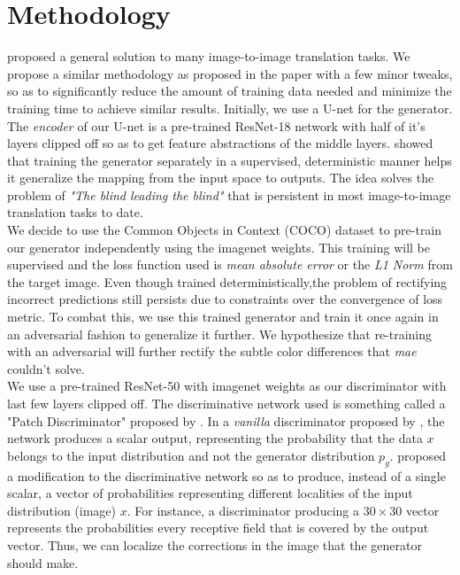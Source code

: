 \documentclass[oneside,a4paper,12pt]{report}
\begin{document}
\section{Methodology}
\hspace*{0.25 in}\cite{isola2018imagetoimage} proposed a general solution to many image-to-image translation tasks. We propose a similar methodology as proposed in the paper with a few minor tweaks, so as to significantly reduce the amount of training data needed and minimize the training time to achieve similar results. Initially, we use a U-net for the generator. The \textit{encoder} of our U-net is a pre-trained ResNet-18 network with half of it's layers clipped off so as to get feature abstractions of the middle layers. \cite{ledig2017photorealistic} showed that training the generator separately in a supervised, deterministic manner helps it generalize the mapping from the input space to outputs. The idea solves the problem of \textit{"The blind leading the blind"} that is persistent in most image-to-image translation tasks to date. \\
\hspace*{0.25 in}We decide to use the Common Objects in Context (COCO) dataset to pre-train our generator independently using the imagenet weights. This training will be supervised and the loss function used is \textit{mean absolute error} or the \textit{L1 Norm} from the target image. Even though trained deterministically,the problem of rectifying incorrect predictions still persists due to constraints over the convergence of loss metric. To combat this, we use this trained generator and train it once again in an adversarial fashion to generalize it further. We hypothesize that re-training with an adversarial will further rectify the subtle color differences that \textit{mae} couldn't solve.\\
\hspace*{0.25 in}We use a pre-trained ResNet-50 with imagenet weights as our discriminator with last few layers clipped off. The discriminative network used is something called a "Patch Discriminator" proposed by \cite{isola2018imagetoimage}. In a \textit{vanilla} discriminator proposed by \cite{goodfellow2014generative}, the network produces a scalar output, representing the probability that the data $x$ belongs to the input distribution and not the generator distribution $p_g$. \cite{isola2018imagetoimage} proposed a modification to the discriminative network so as to produce, instead of a single scalar, a vector of probabilities representing different localities of the input distribution (image) $x$. For instance, a discriminator producing a $30 \times 30$ vector represents the probabilities every receptive field that is covered by the output vector. Thus, we can localize the corrections in the image that the generator should make.\\
\end{document}
